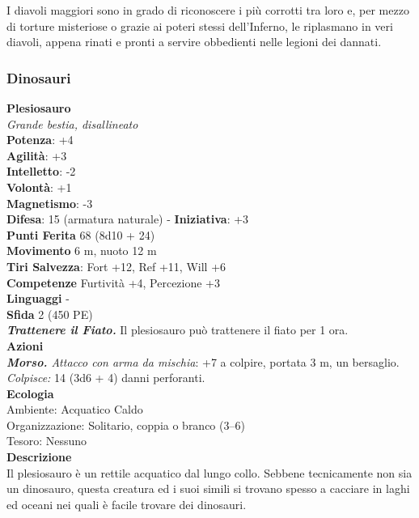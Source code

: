 \begin{multicols}{2}
I diavoli maggiori sono in grado di riconoscere i più corrotti tra loro e, per mezzo di torture misteriose o grazie ai poteri stessi dell’Inferno, le riplasmano in veri diavoli, appena rinati e pronti a servire obbedienti nelle legioni dei dannati.\\

\subsubsection{Dinosauri}

\medskip\textbf{Plesiosauro}\\
\emph{Grande bestia, disallineato}\\
\textbf{Potenza}: +4\\
\textbf{Agilità}: +3\\
\textbf{Intelletto}: -2\\
\textbf{Volontà}: +1\\
\textbf{Magnetismo}: -3\\
\textbf{Difesa}: 15 (armatura naturale) - \textbf{Iniziativa}: +3\\
\textbf{Punti Ferita} 68 (8d10 + 24)\\
\textbf{Movimento} 6 m, nuoto 12 m\\
\textbf{Tiri Salvezza}: Fort +12, Ref +11, Will +6\\
\textbf{Competenze} Furtività +4, Percezione +3\\
\textbf{Linguaggi} -\\
\textbf{Sfida} 2 (450 PE)\smallskip\\
\emph{\textbf{Trattenere il Fiato.}} Il plesiosauro può trattenere il fiato per 1 ora.\\
\smallskip\textbf{Azioni}\\
\emph{\textbf{Morso.} Attacco con arma da mischia}: +7 a colpire, portata 3 m, un bersaglio.\\
\emph{Colpisce:} 14 (3d6 + 4) danni perforanti. \\
\textbf{Ecologia}\\
Ambiente: Acquatico Caldo\\
Organizzazione: Solitario, coppia o branco (3–6)\\
Tesoro: Nessuno\\
\textbf{Descrizione}\\
Il plesiosauro è un rettile acquatico dal lungo collo. Sebbene tecnicamente non sia un dinosauro, questa creatura ed i suoi simili si trovano spesso a cacciare in laghi ed oceani nei quali è facile trovare dei dinosauri.\\


\end{multicols}
